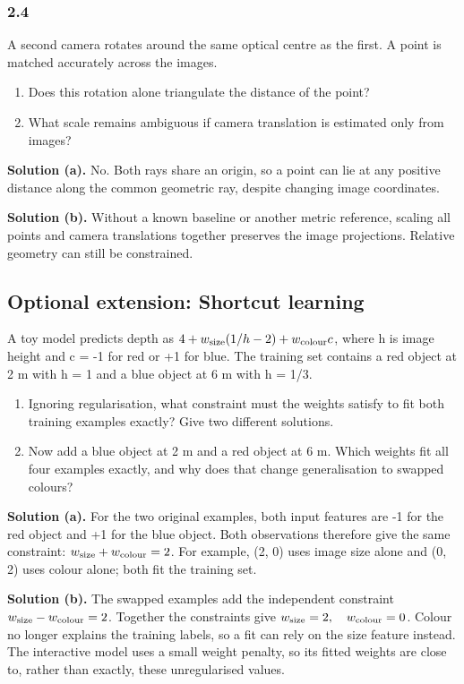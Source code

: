 \documentclass[11pt,a4paper]{article}
\begin{document}
\par\medskip
\par
\noindent
\begin{minipage}{\linewidth}
\subsubsection*{2.4}
A second camera rotates around the same optical centre as the first.
A point is matched accurately across the images.
\begin{enumerate}[label=(\alph*),nosep]
\item Does this rotation alone triangulate the distance of the point?
\item What scale remains ambiguous if camera translation is estimated only from images?
\end{enumerate}
\noindent\textbf{Solution (a).} No.
Both rays share an origin, so a point can lie at any positive distance along the common geometric ray, despite changing image coordinates.

\noindent\textbf{Solution (b).} Without a known baseline or another metric reference, scaling all points and camera translations together preserves the image projections.
Relative geometry can still be constrained.
\end{minipage}
\par\medskip
\par
\noindent
\begin{minipage}{\linewidth}
\subsection*{Optional extension: Shortcut learning}
A toy model predicts depth as $4+w_{\rm size}(1/h-2)+w_{\rm colour}c$, where h is image height and c = -1 for red or +1 for blue.
The training set contains a red object at 2 m with h = 1 and a blue object at 6 m with h = 1/3.
\begin{enumerate}[label=(\alph*),nosep]
\item Ignoring regularisation, what constraint must the weights satisfy to fit both training examples exactly?
Give two different solutions.
\item Now add a blue object at 2 m and a red object at 6 m.
Which weights fit all four examples exactly, and why does that change generalisation to swapped colours?
\end{enumerate}
\noindent\textbf{Solution (a).} For the two original examples, both input features are -1 for the red object and +1 for the blue object.
Both observations therefore give the same constraint: $w_{\rm size}+w_{\rm colour}=2$.
For example, (2, 0) uses image size alone and (0, 2) uses colour alone; both fit the training set.

\noindent\textbf{Solution (b).} The swapped examples add the independent constraint $w_{\rm size}-w_{\rm colour}=2$.
Together the constraints give $w_{\rm size}=2,\quad w_{\rm colour}=0$.
Colour no longer explains the training labels, so a fit can rely on the size feature instead.
The interactive model uses a small weight penalty, so its fitted weights are close to, rather than exactly, these unregularised values.
\end{minipage}
\end{document}
